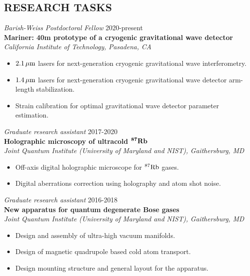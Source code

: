 \documentclass[margin]{res} %
\begin{document}
\begin{resume}
\section{RESEARCH TASKS}

{\sl Barish-Weiss Postdoctoral Fellow} \hfill 2020-present \\
{\bf Mariner: 40m prototype of a cryogenic gravitational wave detector}\\
{\it California Institute of Technology, Pasadena, CA}
\begin{itemize} \itemsep -2pt
\item $2.1\,{\rm \mu m}$ lasers for next-generation cryogenic gravitational wave interferometry.
\item $1.4\,{\rm \mu m}$ lasers for next-generation cryogenic gravitational wave detector arm-length stabilization.
\item Strain calibration for optimal gravitational wave detector parameter estimation.
\end{itemize} 

{\sl Graduate research assistant} \hfill 2017-2020 \\
{\bf Holographic microscopy of ultracold ${\bf ^{87} {\rm \bf Rb}}$}\\
{\it Joint Quantum Institute (University of Maryland and NIST), Gaithersburg, MD}
\begin{itemize} \itemsep -2pt
\item Off-axis digital holographic microscope for ${^{87} {\rm Rb}}$ gases.
\item Digital aberrations correction using holography and atom shot noise.
\end{itemize} 

{\sl Graduate research assistant} \hfill 2016-2018 \\
{\bf New apparatus for quantum degenerate Bose gases}\\
{\it Joint Quantum Institute (University of Maryland and NIST), Gaithersburg, MD}
\begin{itemize} \itemsep -2pt
\item Design and assembly of ultra-high vacuum manifolds.
\item Design of magnetic quadrupole based cold atom transport.
\item Design mounting structure and general layout for the apparatus.
\end{itemize}


\end{resume}
\end{document}
